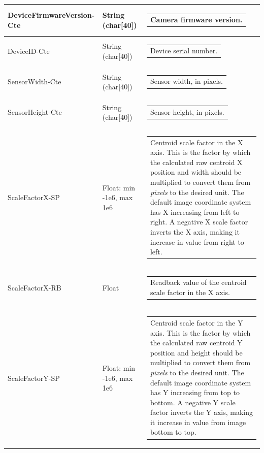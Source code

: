 \documentclass[openany]{article}
\begin{document}
\begin{longtable}{| m{3.0cm} m{4.5cm}  m{7.0cm} |}
        DeviceFirmwareVersion-Cte & String (char[40]) & \begin{tabular}{@{}m{6cm}@{}}
                Camera firmware version.
            \end{tabular} \hypertarget{pv:device-id}{}\\ \hline
        DeviceID-Cte & String (char[40]) & \begin{tabular}{@{}m{6cm}@{}}
                Device serial number.
            \end{tabular} \hypertarget{pv:sensor-width}{}\\ \hline
        SensorWidth-Cte & String (char[40]) & \begin{tabular}{@{}m{6cm}@{}}
                Sensor width, in pixels.
            \end{tabular} \hypertarget{pv:sensor-height}{}\\ \hline
        SensorHeight-Cte & String (char[40]) & \begin{tabular}{@{}m{6cm}@{}}
                Sensor height, in pixels.
            \end{tabular} \hypertarget{pv:scale-factor-x}{}\\ \hline
        ScaleFactorX-SP & Float: min -1e6, max 1e6 & \begin{tabular}{@{}m{6cm}@{}}
                Centroid scale factor in the X axis. This is the factor by which the calculated raw centroid X position and width should be multiplied to convert them from \emph{pixels} to the desired unit. The default image coordinate system has X increasing from left to right. A negative X scale factor inverts the X axis, making it increase in value from right to left.
            \end{tabular} \\ \hline
        ScaleFactorX-RB & Float & \begin{tabular}{@{}m{6cm}@{}}
                Readback value of the centroid scale factor in the X axis.
            \end{tabular} \hypertarget{pv:scale-factor-y}{}\\ \hline
        ScaleFactorY-SP & Float: min -1e6, max 1e6 & \begin{tabular}{@{}m{6cm}@{}}
                Centroid scale factor in the Y axis. This is the factor by which the calculated raw centroid Y position and height should be multiplied to convert them from \emph{pixels} to the desired unit. The default image coordinate system has Y increasing from top to bottom. A negative Y scale factor inverts the Y axis, making it increase in value from image bottom to top.

\end{tabular}
\end{longtable}
\end{document}
